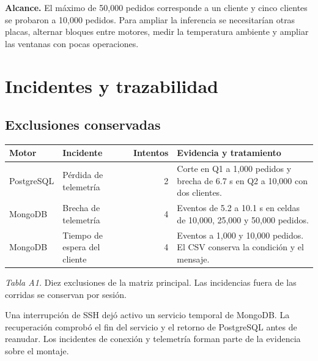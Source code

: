 \documentclass[10pt,a4paper]{article}
\begin{document}
\textbf{Alcance.} El máximo de 50,000 pedidos corresponde a un cliente y cinco clientes se probaron a 10,000 pedidos. Para ampliar la inferencia se necesitarían otras placas, alternar bloques entre motores, medir la temperatura ambiente y ampliar las ventanas con pocas operaciones.

\clearpage
\appendix
\section{Incidentes y trazabilidad}
\subsection{Exclusiones conservadas}
\begin{center}
\small
\begin{tabularx}{.98\linewidth}{@{}llrX@{}}
\toprule Motor & Incidente & Intentos & Evidencia y tratamiento\\
\midrule
PostgreSQL & Pérdida de telemetría & 2 & Corte en Q1 a 1,000 pedidos y brecha de 6.7 s en Q2 a 10,000 con dos clientes.\\
MongoDB & Brecha de telemetría & 4 & Eventos de 5.2 a 10.1 s en celdas de 10,000, 25,000 y 50,000 pedidos.\\
MongoDB & Tiempo de espera del cliente & 4 & Eventos a 1,000 y 10,000 pedidos. El CSV conserva la condición y el mensaje.\\
\bottomrule
\end{tabularx}
\par\smallskip\textit{Tabla A1.} Diez exclusiones de la matriz principal. Las incidencias fuera de las corridas se conservan por sesión.
\end{center}
Una interrupción de SSH dejó activo un servicio temporal de MongoDB. La recuperación comprobó el fin del servicio y el retorno de PostgreSQL antes de reanudar. Los incidentes de conexión y telemetría forman parte de la evidencia sobre el montaje.
\end{document}
